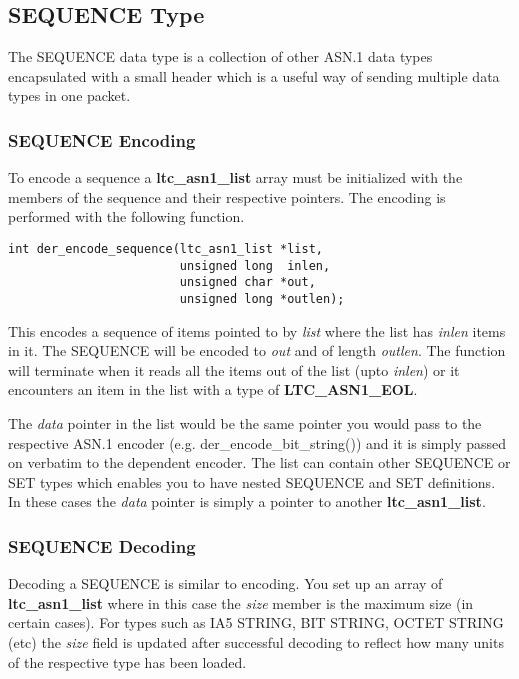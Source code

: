\documentclass[synpaper]{book}
\begin{document}
\subsection{SEQUENCE Type}
The SEQUENCE data type is a collection of other ASN.1 data types encapsulated with a small header which is a useful way of sending multiple data types in one packet.

\subsubsection{SEQUENCE Encoding}
To encode a sequence a \textbf{ltc\_asn1\_list} array must be initialized with the members of the sequence and their respective pointers.  The encoding is performed
with the following function.

\begin{verbatim}
int der_encode_sequence(ltc_asn1_list *list,
                        unsigned long  inlen,
                        unsigned char *out,
                        unsigned long *outlen);
\end{verbatim}
This encodes a sequence of items pointed to by \textit{list} where the list has \textit{inlen} items in it.  The SEQUENCE will be encoded to \textit{out} and of length \textit{outlen}.  The
function will terminate when it reads all the items out of the list (upto \textit{inlen}) or it encounters an item in the list with a type of \textbf{LTC\_ASN1\_EOL}.

The \textit{data} pointer in the list would be the same pointer you would pass to the respective ASN.1 encoder (e.g. der\_encode\_bit\_string()) and it is simply passed on
verbatim to the dependent encoder.  The list can contain other SEQUENCE or SET types which enables you to have nested SEQUENCE and SET definitions.  In these cases
the \textit{data} pointer is simply a pointer to another \textbf{ltc\_asn1\_list}.

\subsubsection{SEQUENCE Decoding}


Decoding a SEQUENCE is similar to encoding.  You set up an array of \textbf{ltc\_asn1\_list} where in this case the \textit{size} member is the maximum size
(in certain cases).  For types such as IA5 STRING, BIT STRING, OCTET STRING (etc) the \textit{size} field is updated after successful decoding to reflect how many
units of the respective type has been loaded.
\end{document}
